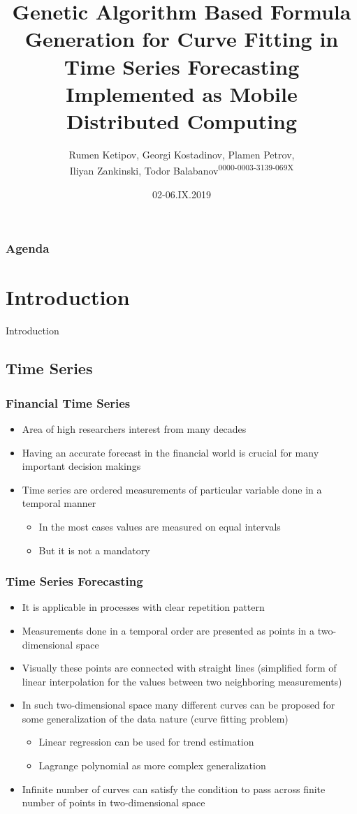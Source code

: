\documentclass{beamer}
\title[High Performance Conference, September 02-06, 2019, Borovets, Bulgaria]{
	Genetic Algorithm Based Formula Generation for Curve Fitting in Time Series Forecasting Implemented as Mobile Distributed Computing
}
\author{Rumen Ketipov, Georgi Kostadinov, Plamen Petrov,\\ Iliyan Zankinski, Todor Balabanov\textsuperscript{0000-0003-3139-069X}}
\date{02-06.IX.2019}
\institute[IICT-BAS, HPC'19] {
	Institute of Information and Communication Technologies \\ 
	Bulgarian Academy of Sciences \\
	\medskip
	\textit{todorb@iinf.bas.bg}
}
\begin{document}
\begin{frame}
\titlepage
\end{frame}

\begin{frame}
\frametitle{Agenda}
\tableofcontents
\end{frame}

\section{Introduction}

\begin{frame}
\center \huge{Introduction}
\end{frame}

\subsection{Time Series}

\begin{frame}
\frametitle{Financial Time Series}
\begin{itemize}
	\item Area of high researchers interest from many decades
	\item Having an accurate forecast in the financial world is crucial for many important decision makings
	\item Time series are ordered measurements of particular variable done in a temporal manner
	\begin{itemize}
		\item In the most cases values are measured on equal intervals
		\item But it is not a mandatory 
	\end{itemize}
\end{itemize}
\end{frame}

\begin{frame}
\frametitle{Time Series Forecasting}
\begin{itemize}
	\item It is applicable in processes with clear repetition pattern
	\item Measurements done in a temporal order are presented as points in a two-dimensional space
	\item Visually these points are connected with straight lines (simplified form of linear interpolation for the values between two neighboring measurements)
	\item In such two-dimensional space many different curves can be proposed for some generalization of the data nature (curve fitting problem)
	\begin{itemize}
		\item Linear regression can be used for trend estimation
		\item Lagrange polynomial as more complex generalization
	\end{itemize}
	\item {\color{red} Infinite number of curves can satisfy the condition to pass across finite number of points in two-dimensional space}
\end{itemize}
\end{frame}
\end{document}
